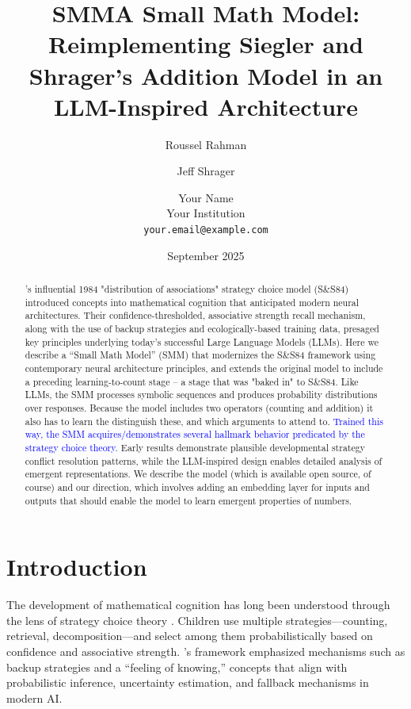 \documentclass{article}
\title{SMM}
\author{Roussel Rahman}
\author{Jeff Shrager}
\date{September 2025}
\title{A Small Math Model: Reimplementing Siegler and Shrager's Addition Model in an LLM-Inspired Architecture}
\author{
  Your Name \\
  Your Institution \\
  \texttt{your.email@example.com}
}
\newcommand{\rrsuggestion}[1]{\textcolor{blue}{#1}}
\begin{document}
\maketitle

\begin{abstract}
\citeauthor{siegler1984strategychoices}'s influential 1984 "distribution of associations" strategy choice model (S\&S84) introduced concepts into mathematical cognition that anticipated modern neural architectures. Their confidence-thresholded, associative strength recall mechanism, along with the use of backup strategies and ecologically-based training data, presaged key principles underlying today's successful Large Language Models (LLMs). Here we describe a ``Small Math Model'' (SMM) that modernizes the S\&S84 framework using contemporary neural architecture principles, and extends the original model to include a preceding learning-to-count stage -- a stage that was "baked in" to S\&S84. Like LLMs, the SMM processes symbolic sequences and produces probability distributions over responses. Because the model includes two operators (counting and addition) it also has to learn the distinguish these, and which arguments to attend to. \rrsuggestion{Trained this way, the SMM acquires/demonstrates several hallmark behavior predicated by the strategy choice theory.} Early results demonstrate plausible developmental strategy conflict resolution patterns, while the LLM-inspired design enables detailed analysis of emergent representations. We describe the model (which is available open source, of course) and our direction, which involves adding an embedding layer for inputs and outputs that should enable the model to learn emergent properties of numbers.
\end{abstract}

\section{Introduction}
The development of mathematical cognition has long been understood through the lens of strategy choice theory \citep{siegler1984strategychoices, siegler1987perils, siegler1991microgenetic, shrager1998scads}. Children use multiple strategies---counting, retrieval, decomposition---and select among them probabilistically based on confidence and associative strength. \citeauthor{siegler1984strategychoices}'s framework emphasized mechanisms such as backup strategies and a ``feeling of knowing,'' concepts that align with probabilistic inference, uncertainty estimation, and fallback mechanisms in modern AI.
\end{document}
